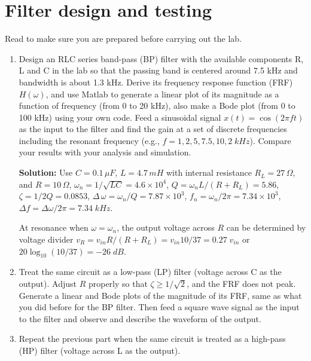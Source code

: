 
\usepackage{html}



\section*{Filter design and testing}

Read 
to make sure you are prepared before carrying out the lab.

\begin{enumerate}

\item Design an RLC series band-pass (BP) filter with the available components R, L 
  and C in the lab so that the passing band is centered around 7.5 kHz and bandwidth
  is about 1.3 kHz. Derive its frequency response function (FRF) $H(\omega)$, and use
  Matlab to generate a linear plot of its magnitude as a function of frequency (from 
  0 to 20 kHz), also make a Bode plot (from 0 to 100 kHz) using your own code. Feed 
  a sinusoidal signal $x(t)=\cos(2\pi ft)$ as the input to the filter and find the 
  gain at a set of discrete frequencies including the resonant frequency (e.g., $f=1, 
  2, 5, 7.5, 10, 2\; kHz$). Compare your results with your analysis and simulation.

  {\bf Solution:} Use $C=0.1\,\mu F$, $L=4.7\,mH$ with internal resistance 
  $R_L=27\,\Omega$, and $R=10\,\Omega$, $\omega_n=1/\sqrt{LC}=4.6\times 10^4$,
  $Q=\omega_nL/(R+R_L)=5.86$, $\zeta=1/2Q=0.0853$, 
  $\Delta\,\omega=\omega_n/Q=7.87\times 10^3$, $f_n=\omega_n/2\pi=7.34\times 10^3$,
  $\Delta f=\Delta\omega/2\pi=7.34\;kHz$.

  At resonance when $\omega=\omega_n$, the output voltage across $R$ can be
  determined by voltage divider $v_R=v_{in} R/(R+R_L)=v_{in} 10/37=0.27\;v_{in}$
  or $20 \log_{10} (10/37)=-26\;dB$.



\item Treat the same circuit as a low-pass (LP) filter (voltage across C as the output).
  Adjust $R$ properly so that $\zeta\ge 1/\sqrt{2}$, and the FRF does not peak. 
  Generate a linear and Bode plots of the magnitude of its FRF, same as what you did 
  before for the BP filter. Then feed a square wave signal as the input to the filter 
  and observe and describe the waveform of the output.

\item Repeat the previous part when the same circuit is treated as a high-pass (HP) 
  filter (voltage across L as the output).


\end{enumerate}
